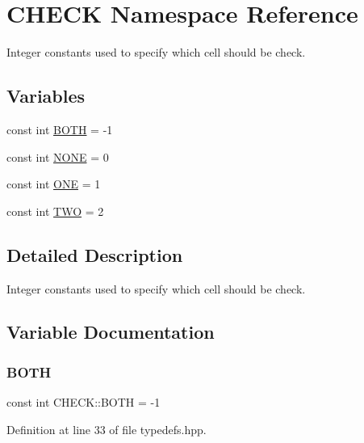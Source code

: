 \hypertarget{namespace_c_h_e_c_k}{}\section{C\+H\+E\+CK Namespace Reference}
\label{namespace_c_h_e_c_k}


Integer constants used to specify which cell should be check.  


\subsection*{Variables}
\begin{DoxyCompactItemize}
\item 
const int \hyperlink{namespace_c_h_e_c_k_a3acda1c74bfabb5b6b67e19d0ad2d52a}{B\+O\+TH} = -\/1
\item 
const int \hyperlink{namespace_c_h_e_c_k_a35fad085a9d64167bd4550445c4dc9e1}{N\+O\+NE} = 0
\item 
const int \hyperlink{namespace_c_h_e_c_k_acf8ecf93ddfb75456112712630f8f722}{O\+NE} = 1
\item 
const int \hyperlink{namespace_c_h_e_c_k_a2b112aaec4c59311376a5a60f291aa48}{T\+WO} = 2
\end{DoxyCompactItemize}


\subsection{Detailed Description}
Integer constants used to specify which cell should be check. 

\subsection{Variable Documentation}
\mbox{\label{namespace_c_h_e_c_k_a3acda1c74bfabb5b6b67e19d0ad2d52a}} 
\subsubsection{\texorpdfstring{B\+O\+TH}{BOTH}}
{\footnotesize\ttfamily const int C\+H\+E\+C\+K\+::\+B\+O\+TH = -\/1}



Definition at line 33 of file typedefs.\+hpp.

\mbox{\label{namespace_c_h_e_c_k_a35fad085a9d64167bd4550445c4dc9e1}} 
